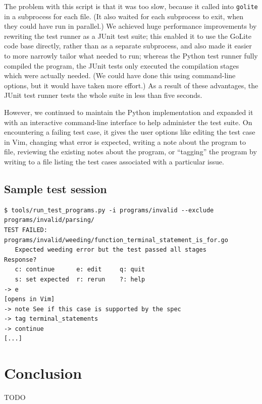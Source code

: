 \documentclass[oneside]{article}
\begin{document}
The problem with this script is that it was too slow, because it called into \texttt{golite} in a subprocess for each file. (It also waited for each subprocess to exit, when they could have run in parallel.) We achieved huge performance improvements by rewriting the test runner as a JUnit test suite; this enabled it to use the GoLite code base directly, rather than as a separate subprocess, and also made it easier to more narrowly tailor what needed to run; whereas the Python test runner fully compiled the program, the JUnit tests only executed the compilation stages which were actually needed. (We could have done this using command-line options, but it would have taken more effort.) As a result of these advantages, the JUnit test runner tests the whole suite in less than five seconds.

However, we continued to maintain the Python implementation and expanded it with an interactive command-line interface to help administer the test suite. On encountering a failing test case, it gives the user options like editing the test case in Vim, changing what error is expected, writing a note about the program to file, reviewing the existing notes about the program, or ``tagging'' the program by writing to a file listing the test cases associated with a particular issue.

\subsection{Sample test session}
\begin{verbatim}
$ tools/run_test_programs.py -i programs/invalid --exclude programs/invalid/parsing/
TEST FAILED: programs/invalid/weeding/function_terminal_statement_is_for.go
   Expected weeding error but the test passed all stages
Response?
   c: continue      e: edit     q: quit
   s: set expected  r: rerun    ?: help
-> e
[opens in Vim]
-> note See if this case is supported by the spec
-> tag terminal_statements
-> continue
[...]
\end{verbatim}

\section{Conclusion}
TODO
\end{document}
